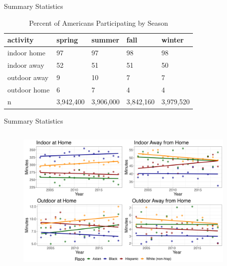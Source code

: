 \documentclass[notes,11pt, aspectratio=169]{beamer}
\newcommand{\highlightrow}[1]{\only<#1>{\rowcolor{gray!20}}}
\begin{document}

\begin{frame}{Summary Statistics}

    \begin{table}
    \caption{Percent of Americans Participating by Season}
    \centering
    \begin{tabular}[t]{lllll}
    \toprule
    activity & spring & summer & fall & winter\\
    \midrule
    indoor home & 97 & 97 & 98 & 98\\
    indoor away & 52 & 51 & 51 & 50\\
    \highlightrow{2} %
    outdoor away & 9 & 10 & 7 & 7\\
    outdoor home & 6 & 7 & 4 & 4\\
    n & 3,942,400 & 3,906,000 & 3,842,160 & 3,979,520\\
    \bottomrule
    \end{tabular}
    \end{table}
\end{frame}


\begin{frame}{Summary Statistics}
\begin{columns}[T] %
\begin{column}{\textwidth}
    \begin{figure}
    \centering
    \includegraphics[height=0.85\textheight]{minutes_per_day.jpeg}
    \end{figure}
\end{column}%
\hfill%
\begin{column}{0.58\textwidth}
  \makebox[\linewidth][c]{
    \resizebox{\linewidth}{!}{
    }
  }
\end{column}%
\end{columns}
\end{frame}
\end{document}
